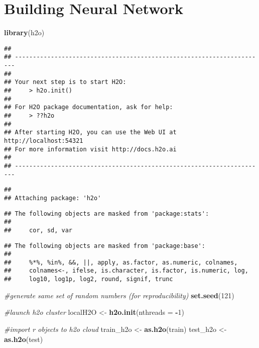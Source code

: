 \documentclass[]{article}
\newenvironment{Shaded}{\begin{snugshade}}{\end{snugshade}}
\newcommand{\KeywordTok}[1]{\textcolor[rgb]{0.13,0.29,0.53}{\textbf{#1}}}
\newcommand{\DataTypeTok}[1]{\textcolor[rgb]{0.13,0.29,0.53}{#1}}
\newcommand{\DecValTok}[1]{\textcolor[rgb]{0.00,0.00,0.81}{#1}}
\newcommand{\StringTok}[1]{\textcolor[rgb]{0.31,0.60,0.02}{#1}}
\newcommand{\CommentTok}[1]{\textcolor[rgb]{0.56,0.35,0.01}{\textit{#1}}}
\newcommand{\OperatorTok}[1]{\textcolor[rgb]{0.81,0.36,0.00}{\textbf{#1}}}
\newcommand{\NormalTok}[1]{#1}
\begin{document}
\section{Building Neural Network}\label{building-neural-network}

\begin{Shaded}
\begin{Highlighting}[]
\KeywordTok{library}\NormalTok{(h2o)}
\end{Highlighting}
\end{Shaded}

\begin{verbatim}
## 
## ----------------------------------------------------------------------
## 
## Your next step is to start H2O:
##     > h2o.init()
## 
## For H2O package documentation, ask for help:
##     > ??h2o
## 
## After starting H2O, you can use the Web UI at http://localhost:54321
## For more information visit http://docs.h2o.ai
## 
## ----------------------------------------------------------------------
\end{verbatim}

\begin{verbatim}
## 
## Attaching package: 'h2o'
\end{verbatim}

\begin{verbatim}
## The following objects are masked from 'package:stats':
## 
##     cor, sd, var
\end{verbatim}

\begin{verbatim}
## The following objects are masked from 'package:base':
## 
##     %*%, %in%, &&, ||, apply, as.factor, as.numeric, colnames,
##     colnames<-, ifelse, is.character, is.factor, is.numeric, log,
##     log10, log1p, log2, round, signif, trunc
\end{verbatim}

\begin{Shaded}
\begin{Highlighting}[]
\CommentTok{#generate same set of random numbers (for reproducibility)}
\KeywordTok{set.seed}\NormalTok{(}\DecValTok{121}\NormalTok{)}

\CommentTok{#launch h2o cluster}
\NormalTok{localH2O <-}\StringTok{ }\KeywordTok{h2o.init}\NormalTok{(}\DataTypeTok{nthreads =} \OperatorTok{-}\DecValTok{1}\NormalTok{)}


\CommentTok{#import r objects to h2o cloud}
\NormalTok{train_h2o <-}\StringTok{ }\KeywordTok{as.h2o}\NormalTok{(train)}
\NormalTok{test_h2o <-}\StringTok{ }\KeywordTok{as.h2o}\NormalTok{(test)}
\end{Highlighting}
\end{Shaded}
\end{document}
